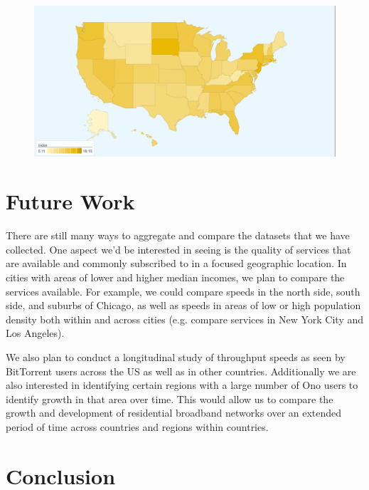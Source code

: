 \documentclass{sig-alternate-10pt}
\begin{document}
\begin{figure}
\centering
        \includegraphics[width=0.9\linewidth]{figs/map.pdf}
  \caption{}
  \label{fig:services-net-index-map}
\end{figure}

\section{Future Work}
\label{sec:future-work} 

There are still many ways to aggregate and compare the datasets that we have
collected.  One aspect we'd be interested in seeing is the quality of services
that are available and commonly subscribed to in a focused geographic location.
In cities with areas of lower and higher median incomes, we plan to compare the
services available. For example, we could compare speeds in the north side,
south side, and suburbs of Chicago, as well as speeds in areas of low or high
population density both within and across cities (e.g. compare services in New
York City and Los Angeles).  

We also plan to conduct a longitudinal study of throughput speeds as seen by
BitTorrent users across the US as well as in other countries.  Additionally we
are also interested in identifying certain regions with a large number of Ono
users to identify growth in that area over time.  This would allow us to 
compare the growth and development of residential broadband networks over
an extended period of time across countries and regions within countries.

\section{Conclusion}
\label{sec:conclusion} 
\end{document}

